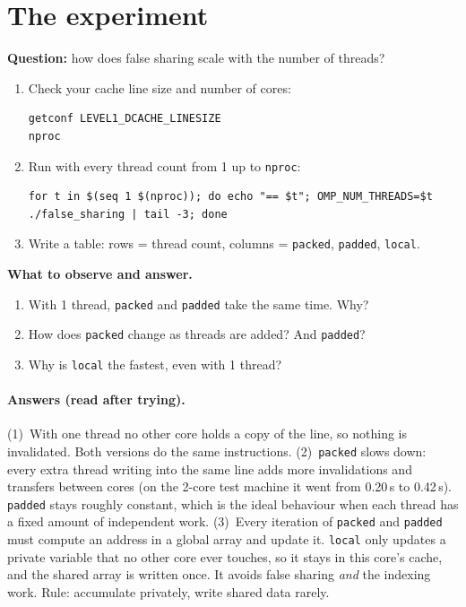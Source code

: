\documentclass[11pt,a4paper]{article}
\begin{document}
\section{The experiment}
\begin{experiment}
\textbf{Question:} how does false sharing scale with the number of threads?
\begin{enumerate}
  \item Check your cache line size and number of cores:
\begin{lstlisting}[style=sh]
getconf LEVEL1_DCACHE_LINESIZE
nproc
\end{lstlisting}
  \item Run with every thread count from 1 up to \texttt{nproc}:
\begin{lstlisting}[style=sh]
for t in $(seq 1 $(nproc)); do echo "== $t"; OMP_NUM_THREADS=$t ./false_sharing | tail -3; done
\end{lstlisting}
  \item Write a table: rows = thread count, columns = \texttt{packed}, \texttt{padded},
        \texttt{local}.
\end{enumerate}
\textbf{What to observe and answer.}
\begin{enumerate}
  \item With 1 thread, \texttt{packed} and \texttt{padded} take the same time. Why?
  \item How does \texttt{packed} change as threads are added? And \texttt{padded}?
  \item Why is \texttt{local} the fastest, even with 1 thread?
\end{enumerate}
\end{experiment}

\paragraph{Answers (read after trying).}
(1)~With one thread no other core holds a copy of the line, so nothing is invalidated.
Both versions do the same instructions.
(2)~\texttt{packed} slows down: every extra thread writing into the same line adds more
invalidations and transfers between cores (on the 2-core test machine it went from 0.20\,s
to 0.42\,s). \texttt{padded} stays roughly constant, which is the ideal behaviour when each
thread has a fixed amount of independent work.
(3)~Every iteration of \texttt{packed} and \texttt{padded} must compute an address in a
global array and update it. \texttt{local} only updates a private variable that no other
core ever touches, so it stays in this core's cache, and the shared array is written once.
It avoids false sharing \emph{and} the indexing work. Rule: accumulate privately, write shared data rarely.
\end{document}
